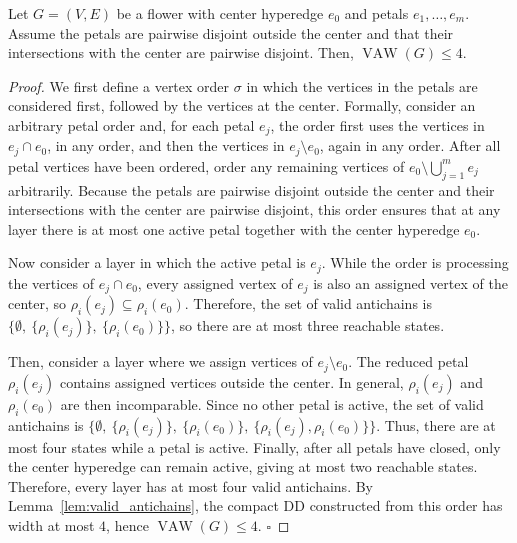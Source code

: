 
\begin{proposition}\label{prop:flower}
Let $G=(V,E)$ be a flower with center hyperedge $e_0$ and petals $e_1,\ldots,e_m$. Assume the petals are pairwise disjoint outside the center and that their intersections with the center are pairwise disjoint. Then, $\operatorname{VAW}(G)\le 4$.
\end{proposition}

\begin{proof}
We first define a vertex order $\sigma$ in which the vertices in the petals are considered first, followed by the vertices at the center. Formally, consider an arbitrary petal order and, for each petal $e_j$, the order first uses the vertices
in $e_j\cap e_0$, in any order, and then the vertices in $e_j\setminus e_0$, again in any order. After all petal vertices have been ordered, order any remaining vertices of
$e_0\setminus \bigcup_{j=1}^m e_j$ arbitrarily. Because the petals are pairwise disjoint outside the center and their intersections with the center are pairwise disjoint, this order ensures that at any layer there is at most one active petal together with the center hyperedge $e_0$.

Now consider a layer in which the active petal is $e_j$. While the order is processing the vertices of $e_j\cap e_0$, every assigned vertex of $e_j$ is also an assigned vertex of the
center, so $\rho_i(e_j)\subseteq \rho_i(e_0)$. Therefore, the set of valid antichains is
$\{
\emptyset,\
\{\rho_i(e_j)\},\
\{\rho_i(e_0)\}\}
$, so there are at most three reachable states.

Then, consider a layer where we assign vertices of $e_j\setminus e_0$. The reduced petal $\rho_i(e_j)$ contains assigned vertices outside the center. In general,
$\rho_i(e_j)$ and $\rho_i(e_0)$ are then incomparable. Since no other petal is active, the set of valid antichains is
$\{\emptyset,\
\{\rho_i(e_j)\},\
\{\rho_i(e_0)\},\
\{\rho_i(e_j),\rho_i(e_0)\} \}$. Thus, there are at most four states while a petal is active. Finally, after all petals
have closed, only the center hyperedge can remain active, giving at most two reachable states. Therefore, every layer has at most four valid antichains. By Lemma~\ref{lem:valid_antichains}, the compact DD constructed from this order has width at most $4$, hence $\operatorname{VAW}(G)\le 4$. \hfill$\square$
\end{proof}

